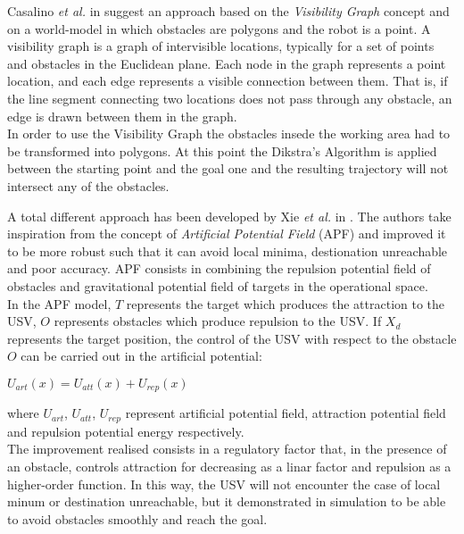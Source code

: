 \documentclass[journal]{IEEEtran}
\begin{document}
              \indent Casalino \textit{et al.} in \parencite{Casalino2009} suggest an approach based on the \textit{Visibility Graph} concept and on a world-model in which obstacles are polygons and the robot is a point. A visibility graph is a graph of intervisible locations, typically for a set of points and obstacles in the Euclidean plane. Each node in the graph represents a point location, and each edge represents a visible connection between them. That is, if the line segment connecting two locations does not pass through any obstacle, an edge is drawn between them in the graph.\\
              In order to use the Visibility Graph the obstacles insede the working area had to be transformed into polygons. At this point the Dikstra's Algorithm is applied between the starting point and the goal one and the resulting trajectory will not intersect any of the obstacles.

              A total different approach has been developed by Xie \textit{et al.} in \parencite{Xie2014}. The authors take inspiration from the concept of \textit{Artificial Potential Field} (APF) \parencite{Khatib1985} and improved it to be more robust such that it can avoid local minima, destionation unreachable and poor accuracy. APF consists in combining the repulsion potential field of obstacles and gravitational potential field of targets in the operational space.\\
              In the APF model, $T$ represents the target which produces the attraction to the USV, $O$ represents obstacles which produce repulsion to the USV. If $X_d$ represents the target position, the control of the USV with respect to the obstacle $O$ can be carried out in the artificial potential:
                  \begin{center}
                         $U_{art}(x) = U_{att}(x) + U_{rep}(x)$
                  \end{center}
              where $U_{art}$, $U_{att}$, $U_{rep}$ represent artificial potential field, attraction potential field and repulsion potential energy respectively.\\
              The improvement realised consists in a regulatory factor that, in the presence of an obstacle, controls attraction for decreasing as a linar factor and repulsion as a higher-order function. In this way, the USV will not encounter the case of local minum or destination unreachable, but it demonstrated in simulation to be able to avoid obstacles smoothly and reach the goal.
\end{document}
